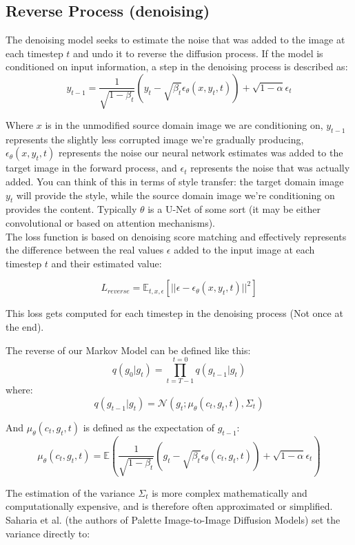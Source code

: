 \documentclass[12pt]{article}
\begin{document}
\subsection{Reverse Process (denoising)}

The denoising model seeks to estimate the noise that was added to the image at each timestep \(t\) and undo it to reverse the diffusion process.   If the model is conditioned on input information, a step in the denoising process is described as: 
\[y_{t-1} = \frac{1}{\sqrt{1 - \beta_t}}\left(y_t - \sqrt{\beta_t}\epsilon_\theta(x, y_t, t) \right) + \sqrt{1-\alpha}\epsilon_t\]

Where \(x\) is in the unmodified source domain image we are conditioning on, \(y_{t-1}\) represents the slightly less corrupted image we're gradually producing, \(\epsilon_\theta(x, y_t, t)\) represents the noise our neural network estimates was added to the target image in the forward process, and \(\epsilon_t\) represents the noise that was actually added.  You can think of this in terms of style transfer: the target domain image \(y_t\) will provide the style, while the source domain image we're conditioning on provides the content. Typically \(\theta\) is a U-Net of some sort (it may be either convolutional or based on attention mechanisms).\\


The loss function is based on denoising score matching and effectively represents the difference between the real values \(\epsilon\) added to the input image at each timestep \(t\) and their estimated value:

\[L_{reverse} = \mathbb{E}_{t,x,\epsilon}\left[ || \epsilon - \epsilon_\theta(x,y_t, t) ||^2 \right]\]

This loss gets computed for each timestep in the denoising process (Not once at the end).


The reverse of our Markov Model can be defined like this: 
\[q(g_0 | g_{t}) = \prod_{t=T-1}^{t=0}q(g_{t-1} | g_t)\]
where:
\[q(g_{t-1} | g_t) = \mathcal{N}(g_t; \mu_\theta(c_t, g_t,t), \Sigma_t)\]

And \(\mu_\theta(c_t, g_t,t)\) is defined as the expectation of \(g_{t-1}\):
\[\mu_\theta(c_t, g_t,t) = \mathbb{E}\left(\frac{1}{\sqrt{1 - \beta_t}}\left(g_t - \sqrt{\beta_t}\epsilon_\theta(c_t, g_t, t) \right) + \sqrt{1-\alpha}\epsilon_t \right)\]

The estimation of the variance \(\Sigma_t\) is more complex mathematically and computationally expensive, and is therefore often approximated or simplified. Saharia et al. (the authors of Palette Image-to-Image Diffusion Models) set the variance directly to:
\end{document}
